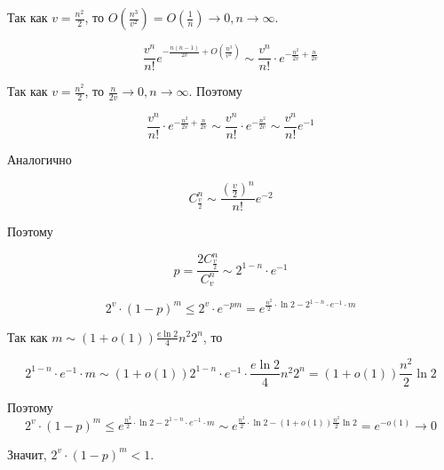 Так как $v = \frac{n^2}{2}$, то $O \left( \frac{n^3}{v^2} \right) = O \left( \frac{1}{n} \right) \to 0, n \to \infty$.

$$
\frac{v^n}{n!} e^{-\frac{n(n - 1)}{2v} + O \left( \frac{n^3}{v^2} \right)}
\sim \frac{v^n}{n!} \cdot e^{-\frac{n^2}{2v} + \frac{n}{2v}}
$$

Так как $v = \frac{n^2}{2}$, то $\frac{n}{2v} \to 0, n \to \infty$. Поэтому

$$
\frac{v^n}{n!} \cdot e^{-\frac{n^2}{2v} + \frac{n}{2v}} \sim
\frac{v^n}{n!} \cdot e^{-\frac{n^2}{2v}} \sim
\frac{v^n}{n!} e^{-1}
$$

Аналогично 

$$
C_{\frac{v}{2}}^{n} \sim \frac{\left( \frac{v}{2} \right)^n}{n!} e^{-2}
$$

Поэтому

$$
p = \frac{2 C_{\frac{v}{2}}^n}{C_v^n} \sim 2^{1 - n} \cdot e^{-1}
$$

$$
2^v \cdot (1 - p)^m \leqslant 2^v \cdot e^{-pm} = 
e^{\frac{n^2}{2} \cdot \ln 2 - 2^{1 - n} \cdot e^{-1} \cdot m}
$$

Так как $m \sim (1 + o(1))\frac{e \ln 2}{4} n^2 2^n$, то

$$
2^{1 - n} \cdot e^{-1} \cdot m \sim
(1 + o(1)) 2^{1 - n} \cdot e^{-1} \cdot \frac{e \ln 2}{4} n^2 2^n = 
(1 + o(1))\frac{n^2}{2} \ln 2
$$

Поэтому 
$$
2^v \cdot (1 - p)^m \leqslant 
e^{\frac{n^2}{2} \cdot \ln 2 - 2^{1 - n} \cdot e^{-1} \cdot m} \sim
e^{\frac{n^2}{2} \cdot \ln 2 - (1 + o(1))\frac{n^2}{2} \ln 2} = 
e^{-o(1)} \to 0
$$

Значит, $2^v \cdot (1 - p)^m < 1$.